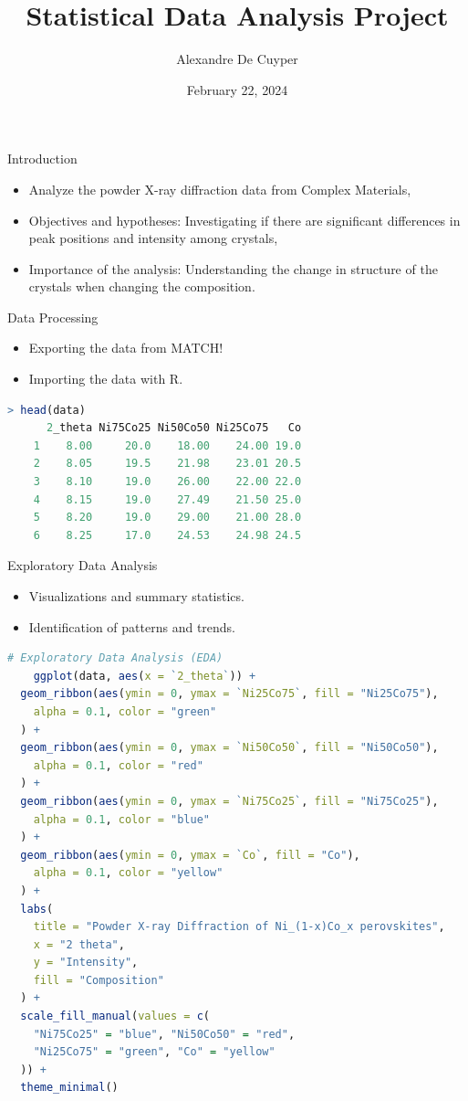 \documentclass[aspectratio=169]{beamer}
\title{Statistical Data Analysis Project}
\author{Alexandre De Cuyper}
\date{February 22, 2024}
\institute{University of A Coruña}
\begin{document}
\frame{\titlepage}

\begin{frame}{Introduction}
    \begin{itemize}
        \item Analyze the powder X-ray diffraction data from Complex Materials,
        \item Objectives and hypotheses: Investigating if there are significant differences in peak positions and intensity among crystals,
        \item Importance of the analysis: Understanding the change in structure of the crystals when changing the composition.
    \end{itemize}
\end{frame}

\begin{frame}[fragile]{Data Processing}
    \begin{itemize}
        \item Exporting the data from MATCH!
        \item Importing the data with R.
    \end{itemize}

    \begin{lstlisting}[language=R]
    > head(data)
      2_theta Ni75Co25 Ni50Co50 Ni25Co75   Co
    1    8.00     20.0    18.00    24.00 19.0
    2    8.05     19.5    21.98    23.01 20.5
    3    8.10     19.0    26.00    22.00 22.0
    4    8.15     19.0    27.49    21.50 25.0
    5    8.20     19.0    29.00    21.00 28.0
    6    8.25     17.0    24.53    24.98 24.5
    \end{lstlisting}
\end{frame}

\begin{frame}[fragile]{Exploratory Data Analysis}
    \begin{itemize}
        \item Visualizations and summary statistics.
        \item Identification of patterns and trends.
    \end{itemize}

    \begin{lstlisting}[language=R, basicstyle=\tiny\ttfamily]
    # Exploratory Data Analysis (EDA)
    ggplot(data, aes(x = `2_theta`)) +
  geom_ribbon(aes(ymin = 0, ymax = `Ni25Co75`, fill = "Ni25Co75"),
    alpha = 0.1, color = "green"
  ) +
  geom_ribbon(aes(ymin = 0, ymax = `Ni50Co50`, fill = "Ni50Co50"),
    alpha = 0.1, color = "red"
  ) +
  geom_ribbon(aes(ymin = 0, ymax = `Ni75Co25`, fill = "Ni75Co25"),
    alpha = 0.1, color = "blue"
  ) +
  geom_ribbon(aes(ymin = 0, ymax = `Co`, fill = "Co"),
    alpha = 0.1, color = "yellow"
  ) +
  labs(
    title = "Powder X-ray Diffraction of Ni_(1-x)Co_x perovskites",
    x = "2 theta",
    y = "Intensity",
    fill = "Composition"
  ) +
  scale_fill_manual(values = c(
    "Ni75Co25" = "blue", "Ni50Co50" = "red",
    "Ni25Co75" = "green", "Co" = "yellow"
  )) +
  theme_minimal()
    \end{lstlisting}
\end{frame}
\end{document}
